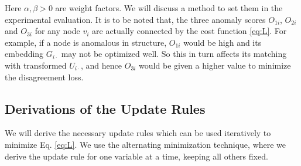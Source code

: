 \documentclass[letterpaper]{article} %
\begin{document}

Here $\alpha, \beta > 0$ are weight factors. We will discuss a method to set them in the experimental evaluation. It is to be noted that, the three anomaly scores $O_{1i}$, $O_{2i}$ and $O_{3i}$ for any node $v_i$ are actually connected by the cost function \ref{eq:L}. For example, if a node is anomalous in structure, $O_{1i}$ would be high and its embedding $G_{i\cdot}$ may not be optimized well. So this in turn affects its matching with transformed $U_{i\cdot}$, and hence $O_{3i}$ would be given a higher value to minimize the disagreement loss.


\subsection{Derivations of the Update Rules}
We will derive the necessary update rules which can be used iteratively to minimize Eq. \ref{eq:L}. 
We use the alternating minimization technique, where we derive the update rule for one variable at a time, keeping all others fixed.
\end{document}
